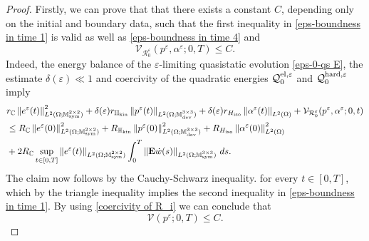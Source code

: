 \documentclass[reqno,10pt]{amsart}
\numberwithin{equation}{section}
\theoremstyle{remark}
\newcommand{\C}{\mathbb{C}}
\newcommand{\M}{\mathbb{M}}
\newcommand{\calQ}{\mathcal{Q}}
\newcommand{\R}{\mathbb{R}}
\newcommand{\calR}{\mathcal{R}}
\newcommand{\calV}{\mathcal{V}}
\DeclareMathOperator{\dev}{dev}
\DeclareMathOperator{\sym}{sym}
\newcommand{\eps}{\varepsilon}
\newcommand{\E}{{\bf E}}
\newcommand{\Hkin}{\mathbb{H}_{\rm kin}}
\newcommand{\Hiso}{H_{\rm iso}}
\begin{document}
\begin{proof} 
Firstly, we can prove that that there exists a constant $C$, depending only on the initial and boundary data, such that the first inequality in \eqref{eps-boundness in time 1} is valid as well as \eqref{eps-boundness in time 4} and 
\begin{equation} \label{eps-boundness in time 111}
	\calV_{\calR^{\eps}_{0}}(p^\eps, \alpha^\eps; 0, T) \leq C.
\end{equation}
Indeed, the energy balance of the $\eps$-limiting quasistatic evolution \ref{eps-0-qs E}, the estimate $\delta(\eps) \ll 1$ and coercivity of the quadratic energies $\calQ^{\rm el,\eps}_{0}$ and $\calQ^{\rm hard,\eps}_{0}$ imply
\begin{align*}
	& r_{\C} \left\|e^\eps(t)\right\|_{L^2(\Omega;\M^{2 \times 2}_{\sym})}^2 + \delta(\eps) r_{\Hkin} \left\|p^\eps(t)\right\|_{L^2(\Omega;\M^{3 \times 3}_{\dev})} + \delta(\eps) r_{\Hiso} \left\|\alpha^\eps(t)\right\|_{L^2(\Omega)} + \calV_{\calR^{\eps}_{0}}(p^\eps, \alpha^\eps; 0, t) \\
	& \leq R_{\C} \left\|e^\eps(0)\right\|_{L^2(\Omega;\M^{2 \times 2}_{\sym})}^2 + R_{\Hkin} \left\|p^\eps(0)\right\|_{L^2(\Omega;\M^{3 \times 3}_{\dev})}^2 + R_{\Hiso} \left\|\alpha^\eps(0)\right\|_{L^2(\Omega)}^2 
	\\& + 2 R_{\C} \sup_{t \in [0,T]} \left\|e^\eps(t)\right\|_{L^2(\Omega;\M^{2 \times 2}_{\sym})} \int_0^T \left\|{\E}\dot{w}(s)\right\|_{L^2(\Omega;\M^{3 \times 3}_{\sym})} \,ds.
\end{align*}
The claim now follows by the Cauchy-Schwarz inequality.
for every $t \in [0,T]$, which by the triangle inequality implies the second inequality in \eqref{eps-boundness in time 1}.
By using
\eqref{coercivity of R_i}
we can conclude that 
\begin{equation} \label{eps-boundness in time 3}
	\calV(p^\eps; 0, T) \leq C.
\end{equation}
	

\end{proof}
\end{document}
